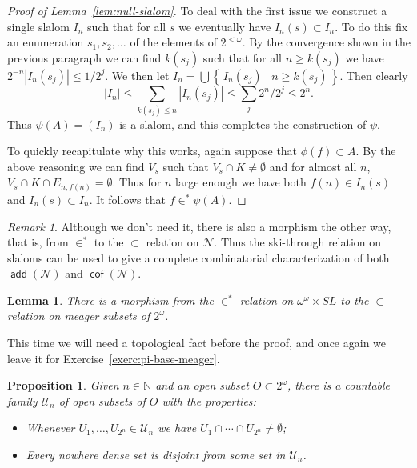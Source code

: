 \documentclass[11pt,oneside]{amsbook}
\newcommand{\set}[1]{\left\{\,#1\,\right\}}
\newcommand{\NN}{\mathbb N}
\newcommand{\Null}{\mathcal N}
\DeclareMathOperator{\add}{\mathsf{add}}
\DeclareMathOperator{\cof}{\mathsf{cof}}
\theoremstyle{definition}
\theoremstyle{plain}
\newtheorem{lem}[thm]{Lemma}
\newtheorem{prop}[thm]{Proposition}
\theoremstyle{definition}
\theoremstyle{remark}
\newtheorem{rem}[thm]{Remark}
\numberwithin{equation}{section}
\numberwithin{figure}{section}
\begin{document}
\begin{proof}[Proof of Lemma~\ref{lem:null-slalom}]
  To deal with the first issue we construct a single slalom $I_n$ such that for all $s$ we eventually have $I_n(s)\subset I_n$. To do this fix an enumeration $s_1,s_2,\ldots$ of the elements of $2^{<\omega}$. By the convergence shown in the previous paragraph we can find $k(s_j)$ such that for all $n\geq k(s_j)$ we have $2^{-n}|I_n(s_j)|\leq1/2^j$. We then let $I_n=\bigcup\set{I_n(s_j)\mid n\geq k(s_j)}$. Then clearly
  \[|I_n|\leq\sum_{k(s_j)\leq n}|I_n(s_j)|\leq\sum_{j}2^n/2^j\leq2^n\text{.}
  \]
  Thus $\psi(A)=(I_n)$ is a slalom, and this completes the construction of $\psi$.

  To quickly recapitulate why this works, again suppose that $\phi(f)\subset A$. By the above reasoning we can find $V_s$ such that $V_s\cap K\neq\emptyset$ and for almost all $n$, $V_s\cap K\cap E_{n,f(n)}=\emptyset$. Thus for $n$ large enough we have both $f(n)\in I_n(s)$ and $I_n(s)\subset I_n$. It follows that $f\in^*\psi(A)$.
\end{proof}

\begin{rem}
  Although we don't need it, there is also a morphism the other way, that is, from $\in^*$ to the $\subset$ relation on $\Null$. Thus the ski-through relation on slaloms can be used to give a complete combinatorial characterization of both $\add(\Null)$ and $\cof(\Null)$.
\end{rem}

\begin{lem}
  \label{lem:slalom-meager}
  There is a morphism from the $\in^*$ relation on $\omega^\omega\times SL$ to the $\subset$ relation on meager subsets of $2^\omega$.
\end{lem}

This time we will need a topological fact before the proof, and once again we leave it for Exercise~\ref{exerc:pi-base-meager}.

\begin{prop}
  \label{prop:pi-base-meager}
  Given $n\in\NN$ and an open subset $O\subset2^\omega$, there is a countable family $\mathcal U_n$ of open subsets of $O$ with the properties:
  \begin{itemize}
  \item Whenever $U_1,\ldots,U_{2^n}\in\mathcal U_n$ we have $U_1\cap\cdots\cap U_{2^n}\neq\emptyset$;
  \item Every nowhere dense set is disjoint from some set in $\mathcal U_n$.
  \end{itemize}
\end{prop}
\end{document}
